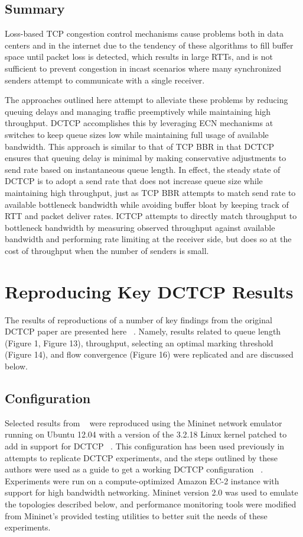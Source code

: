 \subsection{Summary}

Loss-based TCP congestion control mechanisms cause problems both in data centers and in the internet due to the tendency of these algorithms to fill buffer space until packet loss is detected, which results in large RTTs, and is not sufficient to prevent congestion in incast scenarios where many synchronized senders attempt to communicate with a single receiver. 

The approaches outlined here attempt to alleviate these problems by reducing queuing delays and managing traffic preemptively while maintaining high throughput. DCTCP accomplishes this by leveraging ECN mechanisms at switches to keep queue sizes low while maintaining full usage of available bandwidth. This approach is similar to that of TCP BBR in that DCTCP ensures that queuing delay is minimal by making conservative adjustments to send rate based on instantaneous queue length. In effect, the steady state of DCTCP is to adopt a send rate that does not increase queue size while maintaining high throughput, just as TCP BBR attempts to match send rate to available bottleneck bandwidth while avoiding buffer bloat by keeping track of RTT and packet deliver rates. ICTCP attempts to directly match throughput to bottleneck bandwidth by measuring observed throughput against available bandwidth and performing rate limiting at the receiver side, but does so at the cost of throughput when the number of senders is small.

\section{Reproducing Key DCTCP Results}

The results of reproductions of a number of key findings from the original DCTCP paper are presented here ~\cite{alizadeh_data_2010}. Namely, results related to queue length (Figure 1, Figure 13), throughput, selecting an optimal marking threshold (Figure 14), and flow convergence (Figure 16) were replicated and are discussed below.  

\subsection{Configuration}

Selected results from ~\cite{alizadeh_data_2010} were reproduced using the Mininet network emulator running on Ubuntu 12.04 with a version of the 3.2.18 Linux kernel patched to add in support for DCTCP ~\cite{mininet_team_mininet:_2014}. This configuration has been used previously in attempts to replicate DCTCP experiments, and the steps outlined by these authors were used as a guide to get a working DCTCP configuration ~\cite{raghaven_cs244_2013}. Experiments were run on a compute-optimized Amazon EC-2 instance with support for high bandwidth networking. Mininet version 2.0 was used to emulate the topologies described below, and performance monitoring tools were modified from Mininet's provided testing utilities to better suit the needs of these experiments.


